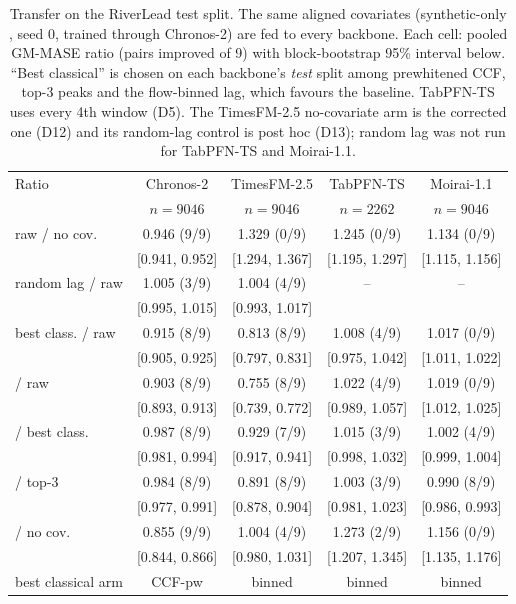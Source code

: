 \begin{table}[t]\centering\small
\caption{Transfer on the RiverLead test split. The same aligned covariates (synthetic-only \lta{}, seed 0, trained through Chronos-2) are fed to every backbone. Each cell: pooled GM-MASE ratio (pairs improved of 9) with block-bootstrap 95\% interval below. ``Best classical'' is chosen on each backbone's \emph{test} split among prewhitened CCF, top-3 peaks and the flow-binned lag, which favours the baseline. TabPFN-TS uses every 4th window (D5). The TimesFM-2.5 no-covariate arm is the corrected one (D12) and its random-lag control is post hoc (D13); random lag was not run for TabPFN-TS and Moirai-1.1.}
\label{tab:transfer}
\setlength{\tabcolsep}{4pt}\begin{tabular}{lcccc}
\toprule
Ratio & Chronos-2 & TimesFM-2.5 & TabPFN-TS & Moirai-1.1 \\
 & $n=9046$ & $n=9046$ & $n=2262$ & $n=9046$ \\
\midrule
raw / no cov. & 0.946 (9/9) & 1.329 (0/9) & 1.245 (0/9) & 1.134 (0/9) \\
 & {\footnotesize [0.941, 0.952]} & {\footnotesize [1.294, 1.367]} & {\footnotesize [1.195, 1.297]} & {\footnotesize [1.115, 1.156]} \\[2pt]
random lag / raw & 1.005 (3/9) & 1.004 (4/9) & -- & -- \\
 & {\footnotesize [0.995, 1.015]} & {\footnotesize [0.993, 1.017]} & {\footnotesize } & {\footnotesize } \\[2pt]
best class. / raw & 0.915 (8/9) & 0.813 (8/9) & 1.008 (4/9) & 1.017 (0/9) \\
 & {\footnotesize [0.905, 0.925]} & {\footnotesize [0.797, 0.831]} & {\footnotesize [0.975, 1.042]} & {\footnotesize [1.011, 1.022]} \\[2pt]
\lta{} / raw & 0.903 (8/9) & 0.755 (8/9) & 1.022 (4/9) & 1.019 (0/9) \\
 & {\footnotesize [0.893, 0.913]} & {\footnotesize [0.739, 0.772]} & {\footnotesize [0.989, 1.057]} & {\footnotesize [1.012, 1.025]} \\[2pt]
\lta{} / best class. & 0.987 (8/9) & 0.929 (7/9) & 1.015 (3/9) & 1.002 (4/9) \\
 & {\footnotesize [0.981, 0.994]} & {\footnotesize [0.917, 0.941]} & {\footnotesize [0.998, 1.032]} & {\footnotesize [0.999, 1.004]} \\[2pt]
\lta{} / top-3 & 0.984 (8/9) & 0.891 (8/9) & 1.003 (3/9) & 0.990 (8/9) \\
 & {\footnotesize [0.977, 0.991]} & {\footnotesize [0.878, 0.904]} & {\footnotesize [0.981, 1.023]} & {\footnotesize [0.986, 0.993]} \\[2pt]
\lta{} / no cov. & 0.855 (9/9) & 1.004 (4/9) & 1.273 (2/9) & 1.156 (0/9) \\
 & {\footnotesize [0.844, 0.866]} & {\footnotesize [0.980, 1.031]} & {\footnotesize [1.207, 1.345]} & {\footnotesize [1.135, 1.176]} \\[2pt]
\midrule
best classical arm & CCF-pw & binned & binned & binned \\
\bottomrule
\end{tabular}
\end{table}